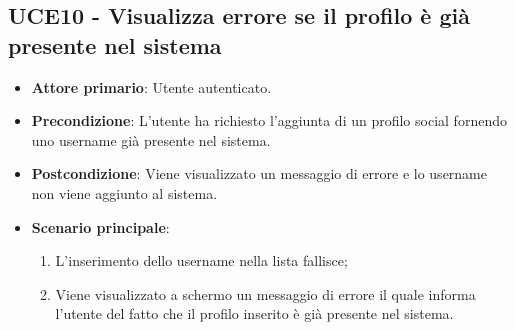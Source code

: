 \subsection{UCE10 - Visualizza errore se il profilo è già presente nel sistema}
\begin{itemize}
    \item \textbf{Attore primario}: Utente autenticato.
    \item \textbf{Precondizione}: L’utente ha richiesto l’aggiunta di un profilo social fornendo uno username già presente nel sistema.
    \item \textbf{Postcondizione}: Viene visualizzato un messaggio di errore e lo username non viene aggiunto al sistema.
    \item \textbf{Scenario principale}: 
    \begin{enumerate}
        \item L'inserimento dello username nella lista fallisce;
        \item Viene visualizzato a schermo un messaggio di errore il quale informa l'utente del fatto che il profilo inserito è già presente nel sistema.
    \end{enumerate}
\end{itemize}
